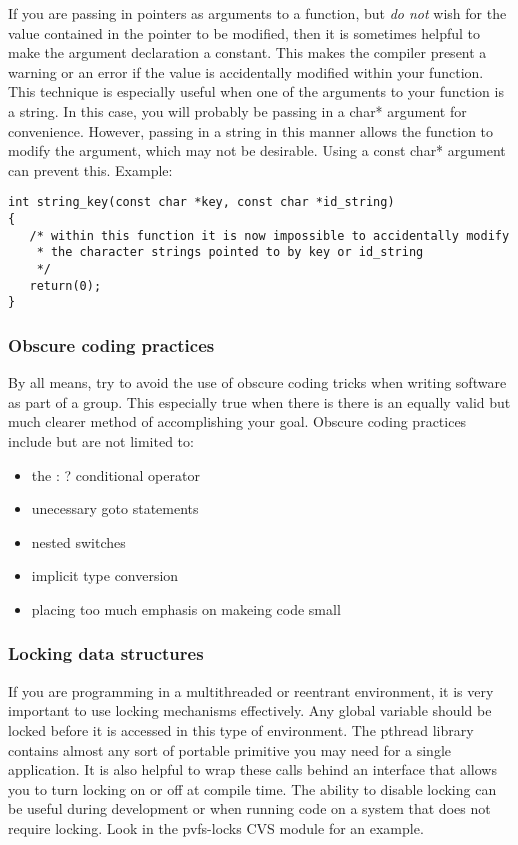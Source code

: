 \documentclass[11pt, letterpaper]{article}
\begin{document}
If you are passing in pointers as arguments to a function, but \emph{do
not}
wish for the value contained in the pointer to be modified, then it is
sometimes helpful to make the argument declaration a constant.  This
makes the compiler present a warning or an error if the value is
accidentally modified within your function.  This technique is
especially useful when one of the arguments to your function is a
string.  In this case, you will probably be passing in a char* argument
for convenience.  However, passing in a string in this manner allows the
function to modify the argument, which may not be desirable.  Using a
const char* argument can prevent this.  Example:
\begin{verbatim}
int string_key(const char *key, const char *id_string)
{
   /* within this function it is now impossible to accidentally modify 
    * the character strings pointed to by key or id_string
    */
   return(0);
}
\end{verbatim}

\subsubsection{Obscure coding practices}

By all means, try to avoid the use of obscure coding tricks when writing
software as part of a group.  This especially true when there is there
is an equally valid but much clearer method of accomplishing your goal.
Obscure coding practices include but are not limited to:

\begin{itemize}
	\item the : ? conditional operator
	\item unecessary goto statements
	\item nested switches
	\item implicit type conversion
	\item placing too much emphasis on makeing code small
\end{itemize}

\subsubsection{Locking data structures}

If you are programming in a multithreaded or reentrant environment, it
is very important to use locking mechanisms effectively.  Any global
variable should be locked before it is accessed in this type of
environment.  The pthread library contains almost any sort of portable
primitive you may need for a single application.  It is also helpful to
wrap these calls behind an interface that allows you to turn locking on
or off at compile time.  The ability to disable locking can be useful
during development or when running code on a system that does not
require locking.  Look in the pvfs-locks CVS module for an example.
\end{document}

